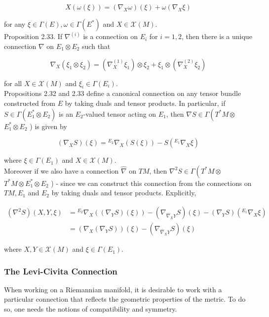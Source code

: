 \documentclass[10pt, letterpaper]{article}
\begin{document}
$$
X(\omega(\xi))=\left(\nabla_{X} \omega\right)(\xi)+\omega\left(\nabla_{X} \xi\right)
$$

for any $\xi \in \Gamma(E), \omega \in \Gamma\left(E^{*}\right)$ and $X \in \mathscr{X}(M)$.\\
Proposition 2.33. If $\nabla^{(i)}$ is a connection on $E_{i}$ for $i=1,2$, then there is a unique connection $\nabla$ on $E_{1} \otimes E_{2}$ such that

$$
\nabla_{X}\left(\xi_{1} \otimes \xi_{2}\right)=\left(\nabla_{X}^{(1)} \xi_{1}\right) \otimes \xi_{2}+\xi_{1} \otimes\left(\nabla_{X}^{(2)} \xi_{2}\right)
$$

for all $X \in \mathscr{X}(M)$ and $\xi_{i} \in \Gamma\left(E_{i}\right)$.\\
Propositions 2.32 and 2.33 define a canonical connection on any tensor bundle constructed from $E$ by taking duals and tensor products. In particular, if $S \in \Gamma\left(E_{1}^{*} \otimes E_{2}\right)$ is an $E_{2}$-valued tensor acting on $E_{1}$, then $\nabla S \in \Gamma\left(T^{*} M \otimes\right.$ $E_{1}^{*} \otimes E_{2}$ ) is given by

$$
\left(\nabla_{X} S\right)(\xi)={ }^{E_{2}} \nabla_{X}(S(\xi))-S\left({ }^{E_{1}} \nabla_{X} \xi\right)
$$

where $\xi \in \Gamma\left(E_{1}\right)$ and $X \in \mathscr{X}(M)$.\\
Moreover if we also have a connection $\widehat{\nabla}$ on $T M$, then $\nabla^{2} S \in \Gamma\left(T^{*} M \otimes\right.$ $T^{*} M \otimes E_{1}^{*} \otimes E_{2}$ ) - since we can construct this connection from the connections on $T M, E_{1}$ and $E_{2}$ by taking duals and tensor products. Explicitly,

$$
\begin{aligned}
\left(\nabla^{2} S\right)(X, Y, \xi) & ={ }^{E_{2}} \nabla_{X}\left(\left(\nabla_{Y} S\right)(\xi)\right)-\left(\nabla_{\widehat{\nabla}_{X} Y} S\right)(\xi)-\left(\nabla_{Y} S\right)\left({ }^{E_{1}} \nabla_{X} \xi\right) \\
& =\left(\nabla_{X}\left(\nabla_{Y} S\right)\right)(\xi)-\left(\nabla_{\widehat{\nabla}_{X} Y} S\right)(\xi)
\end{aligned}
$$

where $X, Y \in \mathscr{X}(M)$ and $\xi \in \Gamma\left(E_{1}\right)$.


\subsubsection*{The Levi-Civita Connection}
When working on a Riemannian manifold, it is desirable to work with a particular connection that reflects the geometric properties of the metric. To do so, one needs the notions of compatibility and symmetry.
\end{document}
